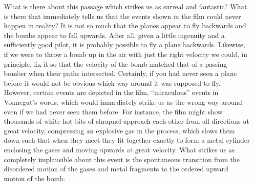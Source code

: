 What is there about this passage which strikes us as surreal and
fantastic? What is there that immediately tells us that the events shown in  
the film could never
happen in reality? It is not so much
 that the planes appear to fly backwards and
the bombs appear to fall upwards. After all, given a little
ingenuity and a sufficiently good pilot,  it is probably possible to
fly a plane backwards. Likewise,
if we  were to throw a bomb up in the air with just the right velocity we
could, in principle,
 fix it so that the velocity of the bomb matched that of a passing bomber when
their paths intersected. Certainly, if you had never seen a plane before it would
not be obvious which way around it was supposed to fly. However, certain events
are depicted in  the film, ``miraculous'' events in Vonnegut's words, which would
immediately strike us as  the wrong way around even if we had never 
seen them before.
For instance, the film might show 
thousands of white hot bits of shrapnel approach each other from
all directions at great velocity,
compressing an explosive gas in the process, 
which slows them down such that when they meet they
fit together exactly to form a metal cylinder  enclosing the gases and 
moving upwards at great velocity. What strikes us as completely implausible about this
event is the spontaneous transition from the disordered motion of the gases and
metal fragments to the ordered upward motion of the bomb. 

